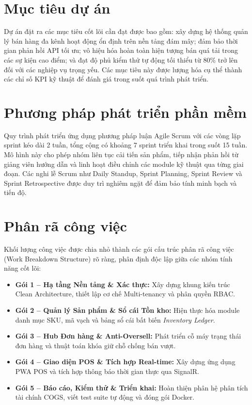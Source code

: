 \documentclass[12pt,a4paper]{report}
\begin{document}
	\section{Mục tiêu dự án}
	Dự án đặt ra các mục tiêu cốt lõi cần đạt được bao gồm: xây dựng hệ thống quản lý bán hàng đa kênh hoạt động ổn định trên nền tảng đám mây; đảm bảo thời gian phản hồi API tối ưu; vô hiệu hóa hoàn toàn hiện tượng bán quá tải trong các sự kiện cao điểm; và đạt độ phủ kiểm thử tự động tối thiểu từ 80\% trở lên đối với các nghiệp vụ trọng yếu. Các mục tiêu này được lượng hóa cụ thể thành các chỉ số KPI kỹ thuật để đánh giá trong suốt quá trình phát triển.
	
	\section{Phương pháp phát triển phần mềm}
	Quy trình phát triển ứng dụng phương pháp luận Agile Scrum với các vòng lặp sprint kéo dài 2 tuần, tổng cộng có khoảng 7 sprint triển khai trong suốt 15 tuần. Mô hình này cho phép nhóm liên tục cải tiến sản phẩm, tiếp nhận phản hồi từ giảng viên hướng dẫn và linh hoạt điều chỉnh các module kỹ thuật qua từng giai đoạn. Các nghi lễ Scrum như Daily Standup, Sprint Planning, Sprint Review và Sprint Retrospective được duy trì nghiêm ngặt để đảm bảo tính minh bạch và tiến độ.
	
	\section{Phân rã công việc}
	Khối lượng công việc được chia nhỏ thành các gói cấu trúc phân rã công việc (Work Breakdown Structure) rõ ràng, phân định độc lập giữa các nhóm tính năng cốt lõi:
	\begin{itemize}
		\item \textbf{Gói 1 -- Hạ tầng Nền tảng \& Xác thực:} Xây dựng khung kiến trúc Clean Architecture, thiết lập cơ chế Multi-tenancy và phân quyền RBAC.
		\item \textbf{Gói 2 -- Quản lý Sản phẩm \& Sổ cái Tồn kho:} Hiện thực hóa module danh mục SKU, mã vạch và bảng sổ cái bất biến \textit{Inventory Ledger}.
		\item \textbf{Gói 3 -- Hub Đơn hàng \& Anti-Oversell:} Phát triển cỗ máy trạng thái đơn hàng và thuật toán khóa giữ chỗ chống bán vượt.
		\item \textbf{Gói 4 -- Giao diện POS \& Tích hợp Real-time:} Xây dựng ứng dụng PWA POS và tích hợp thông báo thời gian thực qua SignalR.
		\item \textbf{Gói 5 -- Báo cáo, Kiểm thử \& Triển khai:} Hoàn thiện phân hệ phân tích tài chính COGS, viết test suite tự động và đóng gói Docker.
	\end{itemize}
	
\end{document}
